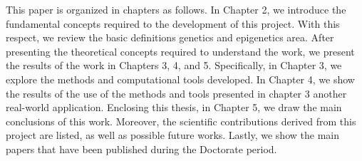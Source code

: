 This paper is organized in chapters as follows. In Chapter 2, we introduce
the fundamental concepts required to the development 
of this project. With this respect, we review the basic definitions genetics and epigenetics area. After presenting the theoretical concepts required to understand the work, we present the results of the work in Chapters 3, 4, and 5. Specifically, in
Chapter 3, we explore the methods and computational tools developed. 
In Chapter 4, we show the results of the use of the methods and tools presented in chapter 3 another real-world application. Enclosing this thesis, in Chapter 5, we draw the
main conclusions of this work. Moreover, the scientific contributions derived from this
project are listed, as well as possible future works. Lastly, we show the main papers
that have been published during the Doctorate period.

